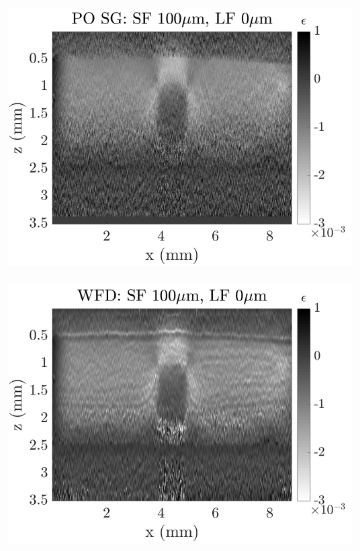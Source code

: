 \begin{figure}[h]
\begin{subfigure}{0.49\textwidth}
        \includegraphics[width=\textwidth]{appendix_figs/posg_fr100_lr0.png}
    \end{subfigure}
    \begin{subfigure}{0.49\textwidth}
    	\centering
        \includegraphics[width=\textwidth]{appendix_figs/wfd_fr100_lr0.png}
    \end{subfigure}
    \\
    \begin{subfigure}{0.49\textwidth}
    	\centering

\end{subfigure}
\end{figure}
